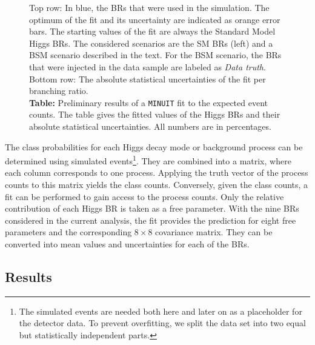 \documentclass[a4paper,11pt]{article}
\begin{document}
\begin{figure}[ht]
\begin{minipage}{0.67\textwidth}
    \end{minipage}
    \begin{minipage}{0.02\textwidth}
    \end{minipage}
    \begin{minipage}{0.3\textwidth}
        \raggedright
        \resizebox{\textwidth}{!}{
        
        }
    \end{minipage}
    \caption{
        Top row: In blue, the BRs that were used in the simulation.
        The optimum of the fit and its uncertainty are indicated as orange error bars.
        The starting values of the fit are always the Standard Model Higgs BRs.
        The considered scenarios are the SM BRs (left)
        and a BSM scenario described in the text.
        For the BSM scenario, the BRs that were injected in the data sample
        are labeled as \textit{Data truth}.
        \\
        Bottom row: The absolute statistical uncertainties
        of the fit per branching ratio.
        \\
        \textbf{Table:}
        Preliminary results of a \texttt{MINUIT} fit to the expected event counts.
        The table gives the fitted values of the Higgs BRs
        and their absolute statistical uncertainties.
        All numbers are in percentages.
    }\label{fig:brs}
\end{figure}

The class probabilities for each Higgs decay mode or background process can
be determined using simulated events\footnote{
    The simulated events are needed both here and later on as a placeholder
    for the detector data.
    To prevent overfitting, we split the data set
    into two equal but statistically independent parts.
}.
They are combined into a matrix, where each column corresponds to one process.
Applying the truth vector of the process counts to this matrix yields the class counts.
Conversely, given the class counts, a fit can be performed to gain access to the
process counts.
Only the relative contribution of each Higgs BR is taken as a free parameter.
With the nine BRs considered in the current analysis,
the fit provides the prediction for eight free parameters
and the corresponding $8 \times 8$ covariance matrix.
They can be converted into mean values and uncertainties for each of the BRs.

\subsection{Results}
\end{document}
